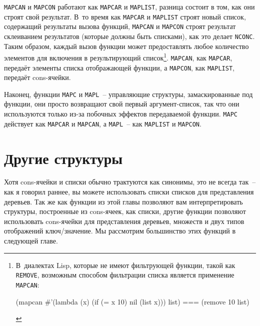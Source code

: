 \lstinline{MAPCAN} и \lstinline{MAPCON} работают как \lstinline{MAPCAR} и \lstinline{MAPLIST}, разница состоит
в том, как они строят свой результат. В~то время как \lstinline{MAPCAR} и \lstinline{MAPLIST} строят
новый список, содержащий результаты вызова функций, \lstinline{MAPCAN} и \lstinline{MAPCON} строят
результат склеиванием результатов (которые должны быть списками), как это делает
\lstinline{NCONC}. Таким образом, каждый вызов функции может предоставлять любое количество
элементов для включения в результирующий список\footnote{В~диалектах Lisp, которые не
  имеют фильтрующей функции, такой как \lstinline{REMOVE}, возможным способом фильтрации списка
  является применение \lstinline{MAPCAN}:

\begin{myverb}
(mapcan #'(lambda (x) (if (= x 10) nil (list x)))  list) === (remove 10 list)
\end{myverb}
}. \lstinline{MAPCAN}, как \lstinline{MAPCAR}, передаёт элементы списка отображающей функции, а
\lstinline{MAPCON}, как \lstinline{MAPLIST}, передаёт cons-ячейки.

Наконец, функции \lstinline{MAPC} и \lstinline{MAPL}~-- управляющие структуры, замаскированные под
функции, они просто возвращают свой первый аргумент-список, так что они используются
только из-за побочных эффектов передаваемой функции. \lstinline{MAPC} действует как
\lstinline{MAPCAR} и \lstinline{MAPCAN}, а \lstinline{MAPL}~-- как \lstinline{MAPLIST} и \lstinline{MAPCON}.


\section{Другие структуры}

Хотя cons-ячейки и списки обычно трактуются как синонимы, это не всегда так~-- как я
говорил раннее, вы можете использовать списки списков для представления деревьев. Так же
как функции из этой главы позволяют вам интерпретировать структуры, построенные из
cons-ячеек, как списки, другие функции позволяют использовать cons-ячейки для
представления деревьев, множеств и двух типов отображений ключ/значение. Мы рассмотрим
большинство этих функций в следующей главе.

